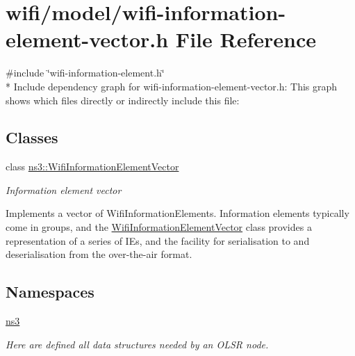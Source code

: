\hypertarget{wifi-information-element-vector_8h}{}\section{wifi/model/wifi-\/information-\/element-\/vector.h File Reference}
\label{wifi-information-element-vector_8h}
{\ttfamily \#include \char`\"{}wifi-\/information-\/element.\+h\char`\"{}}\\*
Include dependency graph for wifi-\/information-\/element-\/vector.h\+:
This graph shows which files directly or indirectly include this file\+:
\subsection*{Classes}
\begin{DoxyCompactItemize}
\item 
class \hyperlink{classns3_1_1WifiInformationElementVector}{ns3\+::\+Wifi\+Information\+Element\+Vector}
\begin{DoxyCompactList}\small\item\em Information element vector

Implements a vector of Wifi\+Information\+Elements. Information elements typically come in groups, and the \hyperlink{classns3_1_1WifiInformationElementVector}{Wifi\+Information\+Element\+Vector} class provides a representation of a series of I\+Es, and the facility for serialisation to and deserialisation from the over-\/the-\/air format. \end{DoxyCompactList}\end{DoxyCompactItemize}
\subsection*{Namespaces}
\begin{DoxyCompactItemize}
\item 
 \hyperlink{namespacens3}{ns3}
\begin{DoxyCompactList}\small\item\em Here are defined all data structures needed by an O\+L\+SR node. \end{DoxyCompactList}\end{DoxyCompactItemize}
